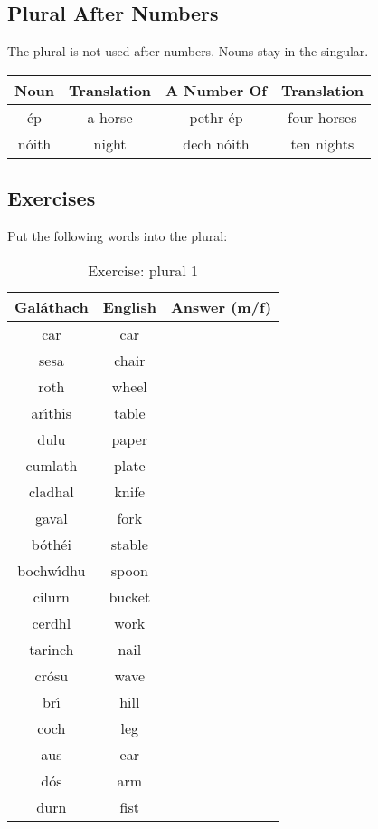 \subsection{Plural After Numbers}

The plural is not used after numbers. Nouns stay in the singular.
\begin{table}[H]
\centering
\begin{tabu}{c|c|c|c}
  \textbf{Noun} & \textbf{Translation} & \textbf{A Number Of} & \textbf{Translation}\\
  \toprule
  \'{e}p & a horse & pethr \'{e}p & four horses\\
  n\'{o}ith & night & dech n\'{o}ith & ten nights
\end{tabu}
\label{example_plural_one_whole}
\end{table}

\newpage
\subsection{Exercises}

Put the following words into the plural:
\begin{table}[H]
\centering
\begin{tabu}{|c|c|M{10.0cm}|}
  \toprule
  \textbf{Gal\'{a}thach} & \textbf{English} & \textbf{Answer (m/f)}\\
  \toprule
  car & car & \\
  \midrule
  sesa & chair & \\
  \midrule
  roth & wheel & \\
  \midrule
  ar\'{\i}this & table & \\
  \midrule
  dulu & paper & \\
  \midrule
  cumlath & plate & \\
  \midrule
  cladhal & knife & \\
  \midrule
  gaval & fork & \\
  \midrule
  b\'{o}th\'{e}i & stable & \\
  \midrule
  bochw\'{\i}dhu & spoon & \\
  \midrule
  cilurn & bucket & \\
  \midrule
  cerdhl & work & \\
  \midrule
  tarinch & nail & \\
  \midrule
  cr\'{o}su & wave & \\
  \midrule
  br\'{\i} & hill & \\
  \midrule
  coch & leg & \\
  \midrule
  aus & ear & \\
  \midrule
  d\'{o}s & arm & \\
  \midrule
  durn & fist & \\
  \bottomrule
\end{tabu}
\label{exercise_plural_1}
\caption{Exercise: plural 1}
\end{table}

